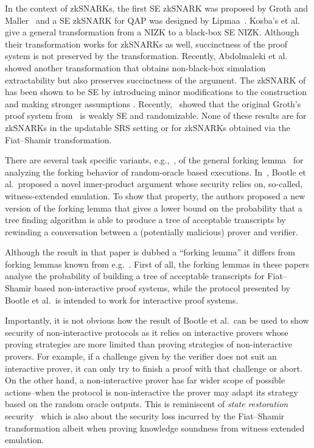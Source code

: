 In the context of zkSNARKs, the first
SE zkSNARK was proposed by Groth and Maller~\cite{C:GroMal17} and a SE
zkSNARK for QAP was designed by Lipmaa~\cite{EPRINT:Lipmaa19a}.
Kosba's et
al.~\cite{EPRINT:KZMQCP15} give a general transformation from a NIZK to a
black-box SE NIZK. Although their transformation works for zkSNARKs as well,
succinctness of the proof system is not preserved by the transformation.
Recently, Abdolmaleki et al.~\cite{CCS:AbdRamSla20} showed another transformation that
obtains non-black-box simulation extractability but also preserves
succinctness of the argument. 
The zkSNARK of~\cite{EC:Groth16} has been shown to be SE by introducing minor modifications to the construction and making
stronger assumptions \cite{EPRINT:BowGab18,EPRINT:AtaBag19}. Recently,~\cite{EPRINT:BKSV20} showed that the
original Groth's proof system from~\cite{EC:Groth16} is weakly SE and
randomizable. None of these results are for zkSNARKs in the updatable SRS setting or for zkSNARKs obtained via the Fiat--Shamir transformation.

There are several task specific variants, e.g.,~\cite{INDOCRYPT:HerSae03,CCS:BagCheJar08,AC:BelDaiLi19}, of the general forking lemma~\cite{JC:PoiSte00,CCS:BelNev06} for analyzing the forking behavior of random-oracle based executions.
In~\cite{EC:BCCGP16}, Bootle et al.~proposed a novel inner-product argument whose
security relies on, so-called, witness-extended emulation. To show that
property, the authors proposed a new version of the forking lemma that gives a
lower bound on the probability that a tree finding algorithm is able to produce a
tree of acceptable transcripts by rewinding a conversation between a
(potentially malicious) prover and verifier.

Although the result in that paper is dubbed a ``forking lemma'' it
differs from forking lemmas known from e.g.~\cite{JC:PoiSte00,CCS:BelNev06}.
First of all, the forking lemmas in these papers analyse the probability of building
a tree of acceptable transcripts for Fiat--Shamir based non-interactive proof
systems, while the protocol presented by Bootle et al.~is intended to work for
interactive proof systems.

Importantly, it is not obvious how the result of Bootle et al.~can be used to
show security of non-interactive protocols as it relies on interactive provers
whose proving strategies are more limited than proving strategies of
non-interactive provers. For example, if a challenge given by the verifier does not
suit an interactive prover, it can only try to finish a proof with that challenge or
abort. On the other hand, a non-interactive prover has far wider scope of
possible actions--when the protocol is non-interactive the prover may
adapt its strategy based on the random oracle outputs. 
This is reminiscent of \emph{state restoration} security~\cite{TCC:BenChiSpo16,EPRINT:Holmgren19} which is also about the security loss incurred by the Fiat--Shamir transformation albeit when proving knowledge soundness from witness extended emulation.

